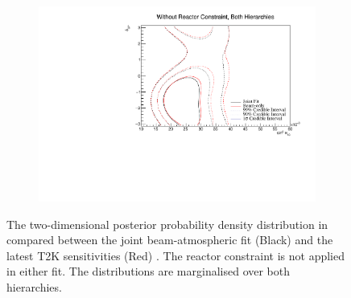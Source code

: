 \begin{figure}[h]
  \begin{subfigure}[t]{0.98\textwidth}
    \includegraphics[width=\textwidth, trim={0mm 0mm 0mm 0mm}, clip,page=1]{Figures/OA/JointFit_OA2020_Comp/ContourComparison_2D_th13_dcp_BH_0_woRC_UnSmeared_CredibleInterval.pdf}
  \end{subfigure}
  \caption{The two-dimensional posterior probability density distribution in  compared between the joint beam-atmospheric fit (Black) and the latest T2K sensitivities (Red) \cite{Dunne2020-uf, t2k_tn_393}. The reactor constraint is not applied in either fit. The distributions are marginalised over both hierarchies.}
  \label{fig:OscillationAnalysis_JointFit_OA2020_DCPTH13}
\end{figure}

